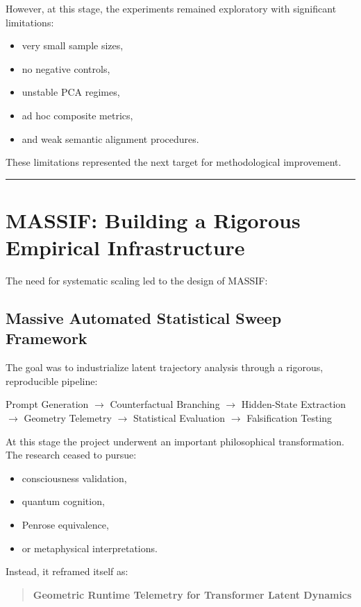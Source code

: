 \documentclass[12pt,a4paper]{article}
\begin{document}
However, at this stage, the experiments remained exploratory with significant limitations:
\begin{itemize}
    \item very small sample sizes,
    \item no negative controls,
    \item unstable PCA regimes,
    \item ad hoc composite metrics,
    \item and weak semantic alignment procedures.
\end{itemize}

These limitations represented the next target for methodological improvement.

\medskip
\hrule
\medskip

\section{MASSIF: Building a Rigorous Empirical Infrastructure}

The need for systematic scaling led to the design of MASSIF:

\subsection*{Massive Automated Statistical Sweep Framework}

The goal was to industrialize latent trajectory analysis through a rigorous, reproducible pipeline:

\begin{center}
Prompt Generation $\rightarrow$ Counterfactual Branching $\rightarrow$ Hidden-State Extraction $\rightarrow$ Geometry Telemetry $\rightarrow$ Statistical Evaluation $\rightarrow$ Falsification Testing
\end{center}

At this stage the project underwent an important philosophical transformation. The research ceased to pursue:
\begin{itemize}
    \item consciousness validation,
    \item quantum cognition,
    \item Penrose equivalence,
    \item or metaphysical interpretations.
\end{itemize}

Instead, it reframed itself as:

\begin{quote}
\textbf{Geometric Runtime Telemetry for Transformer Latent Dynamics}
\end{quote}
\end{document}

